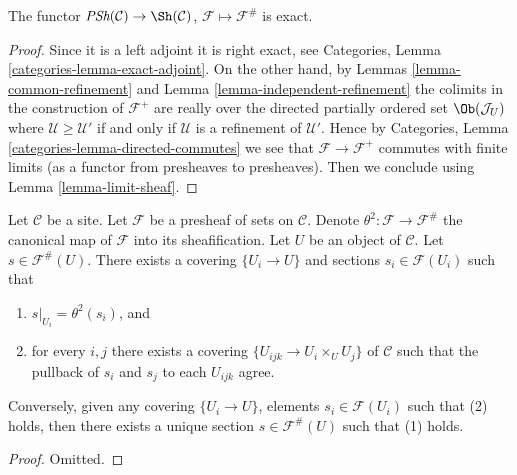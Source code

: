 \begin{lemma}
\label{lemma-sheafification-exact}
The functor $\textit{PSh}(\mathcal{C}) \to \Sh(\mathcal{C})$,
$\mathcal{F} \mapsto \mathcal{F}^\#$ is exact.
\end{lemma}

\begin{proof}
Since it is a left adjoint it is right exact, see
Categories, Lemma \ref{categories-lemma-exact-adjoint}.
On the other hand, by Lemmas \ref{lemma-common-refinement}
and Lemma \ref{lemma-independent-refinement} the colimits
in the construction of $\mathcal{F}^+$ are really over the
directed partially ordered set $\Ob(\mathcal{J}_U)$ where
$\mathcal{U} \geq \mathcal{U}'$ if and only if
$\mathcal{U}$ is a refinement of $\mathcal{U}'$. Hence by
Categories, Lemma \ref{categories-lemma-directed-commutes}
we see that $\mathcal{F} \to \mathcal{F}^+$ commutes
with finite limits (as a functor from presheaves to
presheaves). Then we conclude using
Lemma \ref{lemma-limit-sheaf}.
\end{proof}

\begin{lemma}
\label{lemma-sections-sheafification}
Let $\mathcal{C}$ be a site.
Let $\mathcal{F}$ be a presheaf of sets on $\mathcal{C}$.
Denote $\theta^2 : \mathcal{F} \to \mathcal{F}^\#$ the canonical
map of $\mathcal{F}$ into its sheafification.
Let $U$ be an object of $\mathcal{C}$.
Let $s \in \mathcal{F}^\#(U)$. There exists
a covering $\{U_i \to U\}$ and sections
$s_i \in \mathcal{F}(U_i)$ such that
\begin{enumerate}
\item $s|_{U_i} = \theta^2(s_i)$, and
\item for every $i, j$ there exists a covering
$\{U_{ijk} \to U_i \times_U U_j\}$ of $\mathcal{C}$ such that
the pullback of $s_i$ and $s_j$ to each $U_{ijk}$ agree.
\end{enumerate}
Conversely, given any covering $\{U_i \to U\}$, elements
$s_i \in \mathcal{F}(U_i)$ such that (2) holds, then there
exists a unique section $s \in \mathcal{F}^\#(U)$ such
that (1) holds.
\end{lemma}

\begin{proof}
Omitted.
\end{proof}













